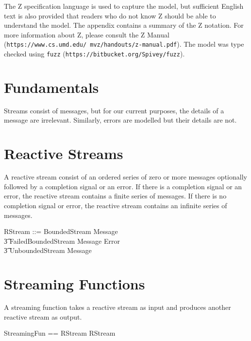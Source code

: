 \documentclass[a4paper,twoside,12pt]{article}
\begin{document}
The Z specification language is used to capture the model, but sufficient English text is also provided that readers who do not know Z should be able to understand the model. The appendix contains a summary of the Z notation.
For more information about Z, please consult the Z Manual (\texttt{https://www.cs.umd.edu/~mvz/handouts/z-manual.pdf}).
The model was type checked using \texttt{fuzz} (\texttt{https://bitbucket.org/Spivey/fuzz}).

\section{Fundamentals}

Streams consist of messages, but for our current purposes, the details of a message are irrelevant.
Similarly, errors are modelled but their details are not.
\begin{zed}
\end{zed}

\newpage
\section{Reactive Streams}

A reactive stream consist of an ordered series of zero or more messages optionally followed by a completion signal or an error.
If there is a completion signal or an error, the reactive stream contains a finite series of messages.
If there is no completion signal or error, the reactive stream contains an infinite series of messages.

\begin{zed}
RStream ::= BoundedStream \ldata \seq Message \rdata \mid \\
	 \t3 FailedBoundedStream \ldata \seq Message \cross Error \rdata \mid \\
	 \t3 UnboundedStream \ldata \nat \fun Message \rdata
\end{zed}

\section{Streaming Functions}

A streaming function takes a reactive stream as input and produces another reactive stream as output.
\begin{zed}
StreamingFun == RStream \fun RStream
\end{zed}
\end{document}
